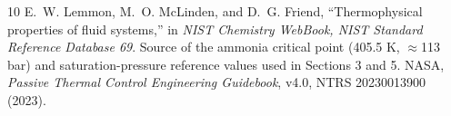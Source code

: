 \documentclass[11pt]{article}
\begin{document}
\begin{thebibliography}{10}
 E.~W. Lemmon, M.~O. McLinden, and D.~G. Friend, ``Thermophysical properties of fluid systems,'' in \emph{NIST Chemistry WebBook, NIST Standard Reference Database 69}. Source of the ammonia critical point (405.5 K, $\approx$113 bar) and saturation-pressure reference values used in Sections 3 and 5.
 NASA, \emph{Passive Thermal Control Engineering Guidebook}, v4.0, NTRS 20230013900 (2023).
\end{thebibliography}
\end{document}
